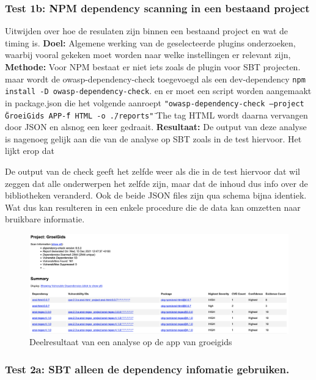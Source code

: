 \subsubsection{Test 1b: NPM dependency scanning in een bestaand project}
Uitwijden over hoe de resulaten zijn binnen een bestaand project en wat de timing is.
\textbf{Doel:} Algemene werking van de geselecteerde plugins onderzoeken, waarbij vooral gekeken moet worden naar welke instellingen er relevant zijn,
\textbf{Methode:}  Voor NPM bestaat er niet iets zoals de plugin voor SBT projecten. maar wordt de owasp-dependency-check toegevoegd als een dev-dependency \texttt{npm install -D owasp-dependency-check}. en er moet een script worden aangemaakt in package.json die het volgende aanroept \texttt{"owasp-dependency-check --project \"GroeiGids APP\" -f HTML -o \"./reports\""} The tag HTML wordt daarna vervangen door JSON en alsnog een keer gedraait.
\textbf{Resultaat:} De output van deze analyse is nagenoeg gelijk aan die van de analyse op SBT zoals in de test hiervoor. Het lijkt erop dat


De output van de check geeft het zelfde weer als die in de test hiervoor dat wil zeggen dat alle onderwerpen het zelfde zijn, maar dat de inhoud dus info over de bibliotheken veranderd. Ook de beide JSON files zijn qua schema bijna identiek. Wat dus kan resulteren in een enkele procedure die de data kan omzetten naar bruikbare informatie.

\begin{figure}[bth]
    \myfloatalign
    \includegraphics[width=15cm]{gfx/report_analyse_test1b_NPM}
    \caption{Deelresultaat van een analyse op de app van groeigids}
    \label{fig:SBTReport1b}
\end{figure}

\subsubsection{Test 2a: SBT alleen de dependency infomatie gebruiken.}



